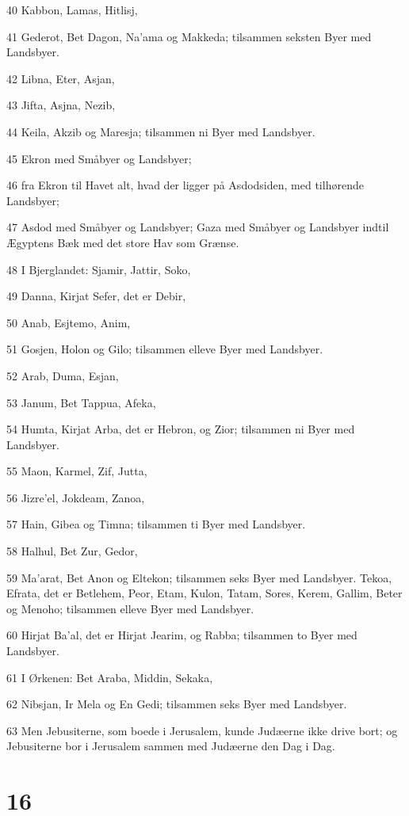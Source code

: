 \par 40 Kabbon, Lamas, Hitlisj,
\par 41 Gederot, Bet Dagon, Na'ama og Makkeda; tilsammen seksten Byer med Landsbyer.
\par 42 Libna, Eter, Asjan,
\par 43 Jifta, Asjna, Nezib,
\par 44 Keila, Akzib og Maresja; tilsammen ni Byer med Landsbyer.
\par 45 Ekron med Småbyer og Landsbyer;
\par 46 fra Ekron til Havet alt, hvad der ligger på Asdodsiden, med tilhørende Landsbyer;
\par 47 Asdod med Småbyer og Landsbyer; Gaza med Småbyer og Landsbyer indtil Ægyptens Bæk med det store Hav som Grænse.
\par 48 I Bjerglandet: Sjamir, Jattir, Soko,
\par 49 Danna, Kirjat Sefer, det er Debir,
\par 50 Anab, Esjtemo, Anim,
\par 51 Gosjen, Holon og Gilo; tilsammen elleve Byer med Landsbyer.
\par 52 Arab, Duma, Esjan,
\par 53 Janum, Bet Tappua, Afeka,
\par 54 Humta, Kirjat Arba, det er Hebron, og Zior; tilsammen ni Byer med Landsbyer.
\par 55 Maon, Karmel, Zif, Jutta,
\par 56 Jizre'el, Jokdeam, Zanoa,
\par 57 Hain, Gibea og Timna; tilsammen ti Byer med Landsbyer.
\par 58 Halhul, Bet Zur, Gedor,
\par 59 Ma'arat, Bet Anon og Eltekon; tilsammen seks Byer med Landsbyer. Tekoa, Efrata, det er Betlehem, Peor, Etam, Kulon, Tatam, Sores, Kerem, Gallim, Beter og Menoho; tilsammen elleve Byer med Landsbyer.
\par 60 Hirjat Ba'al, det er Hirjat Jearim, og Rabba; tilsammen to Byer med Landsbyer.
\par 61 I Ørkenen: Bet Araba, Middin, Sekaka,
\par 62 Nibsjan, Ir Mela og En Gedi; tilsammen seks Byer med Landsbyer.
\par 63 Men Jebusiterne, som boede i Jerusalem, kunde Judæerne ikke drive bort; og Jebusiterne bor i Jerusalem sammen med Judæerne den Dag i Dag.

\chapter{16}

